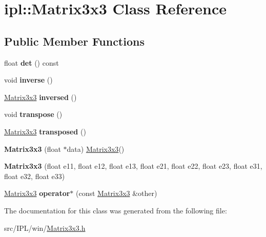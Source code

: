 \hypertarget{classipl_1_1Matrix3x3}{
\section{ipl::Matrix3x3 Class Reference}
\label{classipl_1_1Matrix3x3}
}
\subsection*{Public Member Functions}
\begin{DoxyCompactItemize}
\item 
\hypertarget{classipl_1_1Matrix3x3_a62a2acf58560924e9987a792ca4de106}{
float {\bfseries det} () const }
\label{classipl_1_1Matrix3x3_a62a2acf58560924e9987a792ca4de106}

\item 
\hypertarget{classipl_1_1Matrix3x3_a32ec9e0f51533022d9a87f290c0da602}{
void {\bfseries inverse} ()}
\label{classipl_1_1Matrix3x3_a32ec9e0f51533022d9a87f290c0da602}

\item 
\hypertarget{classipl_1_1Matrix3x3_a7a43ac372b27624b5f8e59acec7064fc}{
\hyperlink{classipl_1_1Matrix3x3}{Matrix3x3} {\bfseries inversed} ()}
\label{classipl_1_1Matrix3x3_a7a43ac372b27624b5f8e59acec7064fc}

\item 
\hypertarget{classipl_1_1Matrix3x3_af928cc3e2b755112e50f259a129c82aa}{
void {\bfseries transpose} ()}
\label{classipl_1_1Matrix3x3_af928cc3e2b755112e50f259a129c82aa}

\item 
\hypertarget{classipl_1_1Matrix3x3_a6910d49261b17000eca6fac4558d1a5a}{
\hyperlink{classipl_1_1Matrix3x3}{Matrix3x3} {\bfseries transposed} ()}
\label{classipl_1_1Matrix3x3_a6910d49261b17000eca6fac4558d1a5a}

\item 
\hypertarget{classipl_1_1Matrix3x3_a44fd84fa0b7e73790226b9726ace48b5}{
{\bfseries Matrix3x3} (float $\ast$data) \hyperlink{classipl_1_1Matrix3x3}{Matrix3x3}()}
\label{classipl_1_1Matrix3x3_a44fd84fa0b7e73790226b9726ace48b5}

\item 
\hypertarget{classipl_1_1Matrix3x3_ac5f003348c089ec2f183451590a1c175}{
{\bfseries Matrix3x3} (float e11, float e12, float e13, float e21, float e22, float e23, float e31, float e32, float e33)}
\label{classipl_1_1Matrix3x3_ac5f003348c089ec2f183451590a1c175}

\item 
\hypertarget{classipl_1_1Matrix3x3_a18c45c9f5cac59a1cc45be6f17590bcc}{
\hyperlink{classipl_1_1Matrix3x3}{Matrix3x3} {\bfseries operator$\ast$} (const \hyperlink{classipl_1_1Matrix3x3}{Matrix3x3} \&other)}
\label{classipl_1_1Matrix3x3_a18c45c9f5cac59a1cc45be6f17590bcc}

\end{DoxyCompactItemize}


The documentation for this class was generated from the following file:\begin{DoxyCompactItemize}
\item 
src/IPL/win/\hyperlink{Matrix3x3_8h}{Matrix3x3.h}\end{DoxyCompactItemize}

